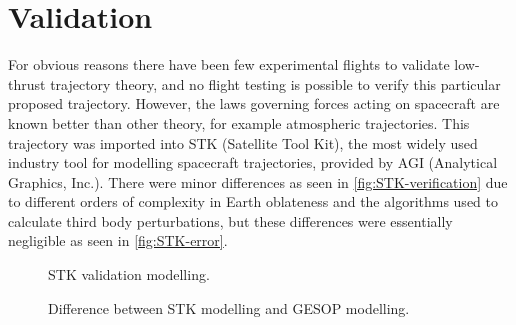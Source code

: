 
\section{Validation}
For obvious reasons there have been few experimental flights to validate low-thrust trajectory theory, and no flight testing is possible to verify this particular proposed trajectory. However, the laws governing forces acting on spacecraft are known better than other theory, for example atmospheric trajectories. This trajectory was imported into STK (Satellite Tool Kit), the most widely used industry tool for modelling spacecraft trajectories, provided by AGI (Analytical Graphics, Inc.). There were minor differences as seen in \autoref{fig:STK-verification} due to different orders of complexity in Earth oblateness and the algorithms used to calculate third body perturbations, but these differences were essentially negligible as seen in \autoref{fig:STK-error}.

\begin{figure}
\centering
\caption{STK validation modelling.}
\label{fig:STK-verification}
\end{figure}

\begin{figure}
\centering
\caption{Difference between STK modelling and GESOP modelling.}
\label{fig:STK-error}
\end{figure}

